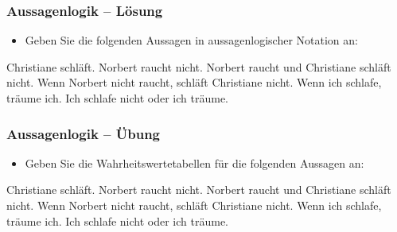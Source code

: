 \begin{frame}
\frametitle{Aussagenlogik -- Lösung}

\begin{itemize}
	\item Geben Sie die folgenden Aussagen in aussagenlogischer Notation an:
\end{itemize}

\begin{exe}
	 Christiane schläft. \hfill {}
	 Norbert raucht nicht. \hfill {}
	 Norbert raucht und Christiane schläft nicht. \hfill {}
	 Wenn Norbert nicht raucht, schläft Christiane nicht. \hfill {}
	 Wenn ich schlafe, träume ich. \hfill {}
	 Ich schlafe nicht oder ich träume. \hfill {}
\end{exe}

\end{frame}



%
%
%
\begin{frame}
\frametitle{Aussagenlogik -- Übung}

\begin{itemize}
	\item Geben Sie die Wahrheitswertetabellen für die folgenden Aussagen an:
\end{itemize}

\ea\label{ex:AL1} Christiane schläft.
\ex\label{ex:AL2} Norbert raucht nicht.
\ex\label{ex:AL3} Norbert raucht und Christiane schläft nicht.
\ex\label{ex:AL4} Wenn Norbert nicht raucht, schläft Christiane nicht.
\ex\label{ex:AL5} Wenn ich schlafe, träume ich.
\ex\label{ex:AL6} Ich schlafe nicht oder ich träume.
\z 

\end{frame}



